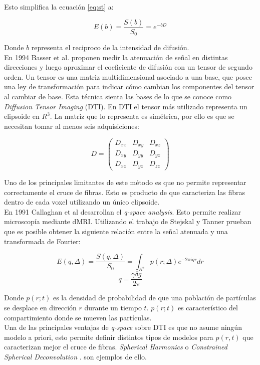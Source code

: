Esto simplifica la ecuaci\'on \ref{eq:st} a:  

$$ E(b) = \frac{S(b)}{S_0} = e^{-b D} $$

Donde $b$ representa el reciproco de la intensidad de difusi\'on. \\

En 1994 Basser et al. \cite{Basser1994} proponen medir la atenuaci\'on de
se\~nal en distintas direcciones y luego aproximar el coeficiente de 
difusi\'on con un tensor de segundo orden. Un tensor es una matriz
multidimensional asociado a una base, que posee una ley de 
transformaci\'on  para indicar  c\'omo cambian los componentes del tensor
al cambiar de base. Esta t\'ecnica sienta las bases de lo que se conoce
como \textit{Diffusion Tensor Imaging} (DTI). En DTI el tensor m\'as
utilizado representa un elipsoide en $R^3$. La matriz que lo representa
es sim\'etrica, por ello es que se necesitan tomar al menos seis
adquisiciones: 

$$
    D =
    \begin{pmatrix}
             D_{xx} & D_{xy} & D_{xz} \\
             D_{xy} & D_{yy} & D_{yz} \\
             D_{xz} & D_{yz} & D_{zz}    
    \end{pmatrix}
$$

Uno de los principales limitantes de este m\'etodo es que no permite
representar correctamente el cruce de fibras. Esto es producto de que
caracteriza las fibras dentro de cada voxel utilizando un \'unico
elipsoide.\\

En 1991 Callaghan et al \cite{Callaghan1991} desarrollan el 
\textit{q-space analysis}. Esto permite realizar microscop\'ia mediante
dMRI. Utilizando el trabajo de Stejskal y Tanner prueban que es posible
obtener la siguiente relaci\'on entre la se\~nal atenuada y una
transformada de Fourier:

$$E(q,\Delta) =  \frac{S(q,\Delta)}{S_0} = \int_{R^2}{p(r;\Delta)e^{-2\pi i q r} dr} $$
$$ q = \frac{\gamma \delta g}{2\pi} $$

Donde $p(r;t)$ es la densidad de probabilidad de que una poblaci\'on de 
part\'iculas se desplace en direcci\'on $r$ durante un tiempo $t$. $p(r;t)$
es caracter\'istico del compartimiento donde se mueven las part\'iculas. \\

Una de las principales ventajas de \textit{q-space} sobre DTI es que no
asume ning\'un modelo a priori, esto permite definir distintos tipos de
modelos para $p(r,t)$ que caracterizan mejor el cruce de fibras. 
\textit{Spherical Harmonics} \cite{Tuch2004} o 
\textit{Constrained Spherical Deconvolution} \cite{Tournier2004}.
son ejemplos de ello.

